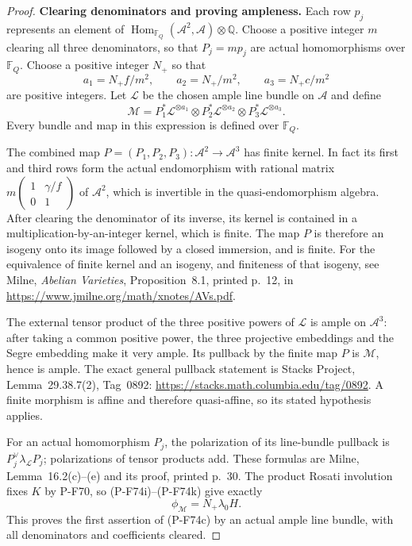 \begin{proof}
\par\medskip\noindent\textbf{Clearing denominators and proving ampleness.}
Each row $p_j$ represents an element of
$\operatorname{Hom}_{\mathbb F_Q}(\mathcal A^2,\mathcal A)
\otimes\mathbb Q$.
Choose a positive integer $m$ clearing all three denominators,
so that $P_j=mp_j$ are actual homomorphisms over $\mathbb F_Q$.
Choose a positive integer $N_+$ so that
\[
        a_1=N_+f/m^2,\qquad a_2=N_+/m^2,\qquad
        a_3=N_+c/m^2
                                                               \tag{P-F74j}
\]
are positive integers.  Let $\mathcal L$ be the chosen ample
line bundle on $\mathcal A$ and define
\[
 \mathcal M=P_1^*\mathcal L^{\otimes a_1}
             \otimes P_2^*\mathcal L^{\otimes a_2}
             \otimes P_3^*\mathcal L^{\otimes a_3}.
                                                               \tag{P-F74k}
\]
Every bundle and map in this expression is defined over
$\mathbb F_Q$.

The combined map $P=(P_1,P_2,P_3):\mathcal A^2\to\mathcal A^3$
has finite kernel.  In fact its first and third rows form
the actual endomorphism with rational matrix
$m\begin{pmatrix}1&\gamma/f\\0&1\end{pmatrix}$ of $\mathcal A^2$,
which is invertible in the quasi-endomorphism algebra.
After clearing the denominator of its inverse, its kernel
is contained in a multiplication-by-an-integer kernel,
which is finite.  The map $P$ is therefore an isogeny
onto its image followed by a closed immersion, and is finite.
For the equivalence of finite kernel and an isogeny, and
finiteness of that isogeny, see Milne, \emph{Abelian Varieties},
Proposition~8.1, printed p.~12, in
\url{https://www.jmilne.org/math/xnotes/AVs.pdf}.

The external tensor product of the three positive powers
of $\mathcal L$ is ample on $\mathcal A^3$: after taking a
common positive power, the three projective embeddings
and the Segre embedding make it very ample.  Its pullback
by the finite map $P$ is $\mathcal M$, hence is ample.
The exact general pullback statement is Stacks Project,
Lemma~29.38.7(2), Tag~0892:
\url{https://stacks.math.columbia.edu/tag/0892}.
A finite morphism is affine and therefore quasi-affine,
so its stated hypothesis applies.

For an actual homomorphism $P_j$, the polarization of its
line-bundle pullback is $P_j^\vee\lambda_{\mathcal L}P_j$;
polarizations of tensor products add.  These formulas are
Milne, Lemma~16.2(c)--(e) and its proof, printed p.~30.
The product Rosati involution fixes $K$ by P-F70, so
(P-F74i)--(P-F74k) give exactly
\[
                    \phi_{\mathcal M}=N_+\lambda_0H.
                                                               \tag{P-F74l}
\]
This proves the first assertion of (P-F74c) by an actual
ample line bundle, with all denominators and coefficients
cleared.


\end{proof}
